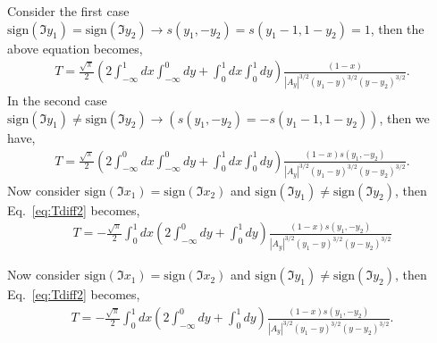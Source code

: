 \documentclass[twoside]{article}
\begin{document}
Consider the first case $\textrm{sign}(\Im y_1) = \textrm{sign}(\Im y_2) \rightarrow s(y_1, -y_2) = s(y_1 - 1, 1 - y_2) = 1$, then the above equation becomes,
\begin{align}
  T = \frac{\sqrt{\pi}}{2}\left(2\int^1_{-\infty}dx\int^0_{-\infty}dy + \int^1_0dx\int^1_0dy
  \right)\frac{(1-x)}{|A_y|^{3/2}(y_1 - y)^{3/2}(y - y_2)^{3/2}}.
\end{align}
In the second case $\textrm{sign}(\Im y_1) \neq \textrm{sign}(\Im y_2) \rightarrow (s(y_1, -y_2) = -s(y_1 - 1, 1-y_2))$, then we have,
\begin{align}
  T = \frac{\sqrt{\pi}}{2}\left( 2\int^0_{-\infty}dx\int^0_{-\infty}dy + \int^1_0dx\int^1_0dy
  \right)\frac{(1-x)s(y_1,-y_2)}{|A_y|^{3/2}(y_1-y)^{3/2}(y-y_2)^{3/2}}.
\end{align}
Now consider $\textrm{sign}(\Im x_1) = \textrm{sign}(\Im x_2)$ and $\textrm{sign}(\Im y_1) \neq \textrm{sign}(\Im y_2)$, then
Eq.~\eqref{eq:Tdiff2} becomes,
\begin{align}
  T = -\frac{\sqrt{\pi}}{2}\int^1_0dx\left( 2\int^0_{-\infty}dy + \int^1_0dy
  \right)\frac{(1-x)s(y_1,-y_2)}{|A_y|^{3/2}(y_1-y)^{3/2}(y - y_2)^{3/2}}
\end{align}


Now consider $\textrm{sign}(\Im x_1) = \textrm{sign}(\Im x_2)$ and $\textrm{sign}(\Im y_1) \neq \textrm{sign}(\Im y_2)$, then
Eq.~\eqref{eq:Tdiff2} becomes,
\begin{align}
  T = -\frac{\sqrt{\pi}}{2}\int^1_0dx\left( 2\int^0_{-\infty}dy + \int^1_0dy
  \right)\frac{(1-x)s(y_1,-y_2)}{|A_y|^{3/2}(y_1-y)^{3/2}(y - y_2)^{3/2}}.
\end{align}
\end{document}
